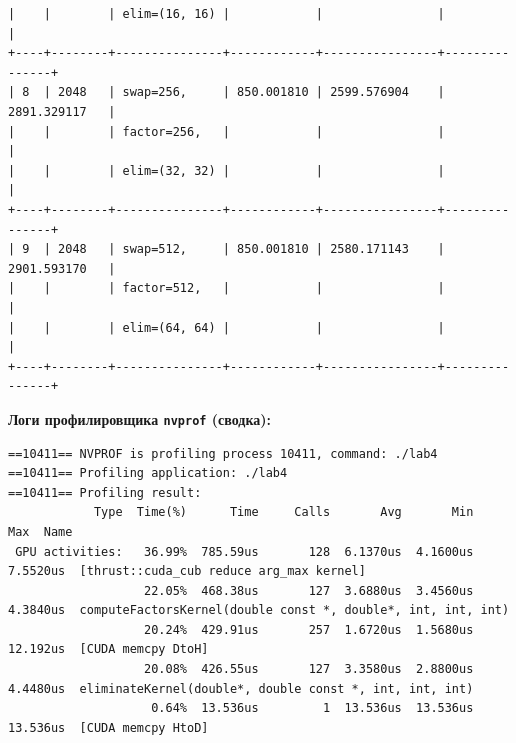 \documentclass[a4paper,14pt]{extarticle}
\begin{document}
\begin{lstlisting}[basicstyle=\ttfamily\scriptsize,frame=single]
|    |        | elim=(16, 16) |            |                |               |
+----+--------+---------------+------------+----------------+---------------+
| 8  | 2048   | swap=256,     | 850.001810 | 2599.576904    | 2891.329117   |
|    |        | factor=256,   |            |                |               |
|    |        | elim=(32, 32) |            |                |               |
+----+--------+---------------+------------+----------------+---------------+
| 9  | 2048   | swap=512,     | 850.001810 | 2580.171143    | 2901.593170   |
|    |        | factor=512,   |            |                |               |
|    |        | elim=(64, 64) |            |                |               |
+----+--------+---------------+------------+----------------+---------------+
\end{lstlisting}

\newpage
\textbf{Логи профилировщика \texttt{nvprof} (сводка):}

\begin{lstlisting}[basicstyle=\ttfamily\scriptsize,frame=single,breaklines=true]
==10411== NVPROF is profiling process 10411, command: ./lab4
==10411== Profiling application: ./lab4
==10411== Profiling result:
            Type  Time(%)      Time     Calls       Avg       Min       Max  Name
 GPU activities:   36.99%  785.59us       128  6.1370us  4.1600us  7.5520us  [thrust::cuda_cub reduce arg_max kernel]
                   22.05%  468.38us       127  3.6880us  3.4560us  4.3840us  computeFactorsKernel(double const *, double*, int, int, int)
                   20.24%  429.91us       257  1.6720us  1.5680us  12.192us  [CUDA memcpy DtoH]
                   20.08%  426.55us       127  3.3580us  2.8800us  4.4480us  eliminateKernel(double*, double const *, int, int, int)
                    0.64%  13.536us         1  13.536us  13.536us  13.536us  [CUDA memcpy HtoD]

\end{lstlisting}
\end{document}
